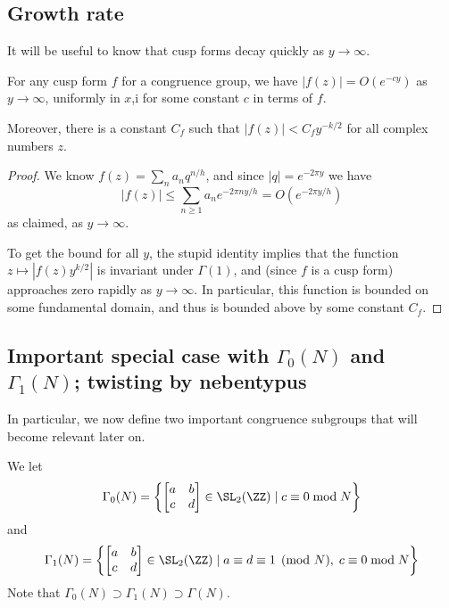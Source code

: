 \subsection{Growth rate}
It will be useful to know that cusp forms decay quickly as $y \to \infty$.
\begin{lemma}
  For any cusp form $f$ for a congruence group,
  we have $|f(z)| = O(e^{-c y})$
  as $y \to \infty$, uniformly in $x$,i
  for some constant $c$ in terms of $f$.

  Moreover, there is a constant $C_f$
  such that $|f(z)| < C_fy^{-k/2}$ for all complex numbers $z$.
\end{lemma}
\begin{proof}
  We know $f(z) = \sum_n a_n q^{n/h}$, and since $|q|=e^{-2\pi y}$ we have
  \[ |f(z)| \le \sum_{n \ge 1} a_n e^{-2\pi n y / h} = O(e^{-2\pi y / h}) \]
  as claimed, as $y \to \infty$.

  To get the bound for all $y$, the stupid identity
  implies that the function
  $z \mapsto |f(z) y^{k/2}|$ is invariant under $\Gamma(1)$,
  and (since $f$ is a cusp form)
  approaches zero rapidly as $y \to \infty$.
  In particular, this function is bounded on some fundamental domain,
  and thus is bounded above by some constant $C_f$.
\end{proof}


\subsection{Important special case with $\Gamma_0(N)$ and $\Gamma_1(N)$; twisting by nebentypus}
In particular, we now define two important congruence subgroups
that will become relevant later on.
\begin{definition}
  We let
  \[ \Gamma_0(N) =
    \left\{ \begin{bmatrix} a & b \\ c & d \end{bmatrix} \in \SL_2(\ZZ)
    \mid c \equiv 0 \bmod N\right\} \]
  and
  \[ \Gamma_1(N) =
    \left\{ \begin{bmatrix} a & b \\ c & d \end{bmatrix} \in \SL_2(\ZZ)
    \mid a \equiv d \equiv 1 \pmod N, \; c \equiv 0 \bmod N\right\} \]
  Note that $\Gamma_0(N) \supset \Gamma_1(N) \supset \Gamma(N)$.
\end{definition}

